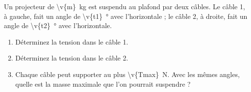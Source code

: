 Un projecteur de \qty{\v{m}}{kg} est suspendu au plafond par deux câbles. Le câble 1, à gauche, fait un angle de \qty{\v{t1}}{\degree} avec l'horizontale ; le câble 2, à droite, fait un angle de \qty{\v{t2}}{\degree} avec l'horizontale.

\begin{center}
\end{center}

\begin{enumerate}[label=\alph*)]
    \item Déterminez la tension dans le câble 1.
    \item Déterminez la tension dans le câble 2.
    \item Chaque câble peut supporter au plus \qty{\v{Tmax}}{N}. Avec les mêmes angles, quelle est la masse maximale que l'on pourrait suspendre ?
\end{enumerate}
